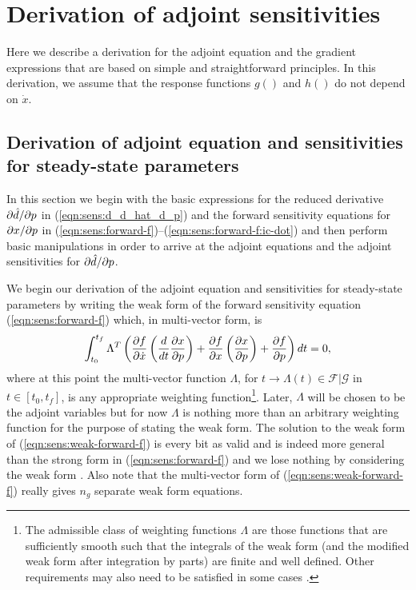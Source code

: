 \documentclass[pdf,ps2pdf,11pt]{SANDreport}
\begin{document}
\section{Derivation of adjoint sensitivities}

Here we describe a derivation for the adjoint equation and the gradient
expressions that are based on simple and straightforward principles.  In this
derivation, we assume that the response functions $g()$ and $h()$ do not
depend on $\dot{x}$.

\subsection{Derivation of adjoint equation and sensitivities for steady-state parameters}
\label{rythmos:app:adj-equ-derivation}

In this section we begin with the basic expressions for the reduced derivative
$\partial \hat{d} / \partial p$ in (\ref{eqn:sens:d_d_hat_d_p}) and the forward sensitivity
equations for $\partial x / \partial p$ in
(\ref{eqn:sens:forward-f})--(\ref{eqn:sens:forward-f:ic-dot}) and then perform
basic manipulations in order to arrive at the adjoint equations and the
adjoint sensitivities for $\partial \hat{d} / \partial p$.

We begin our derivation of the adjoint equation and sensitivities for
steady-state parameters by writing the weak form of the forward sensitivity
equation (\ref{eqn:sens:forward-f}) which, in multi-vector form, is
%
\begin{equation}
\int_{t_0}^{t_f} \Lambda^T \left(
\displaystyle{\frac{\partial f}{\partial \dot{x}}} \left(\frac{d}{dt} \displaystyle{\frac{\partial x}{\partial p}} \right)
+ \displaystyle{\frac{\partial f}{\partial x}} \left(\displaystyle{\frac{\partial x}{\partial p}}\right)
+ \displaystyle{\frac{\partial f}{\partial p}}
\right) dt = 0,
\label{eqn:sens:weak-forward-f}
\end{equation}
%
where at this point the multi-vector function $\Lambda$, for
$t\rightarrow\Lambda(t)\in\mathcal{F}|\mathcal{G}$ in $t\in[t_0,t_f]$, is any
appropriate weighting function\footnote{The admissible class of weighting
functions $\Lambda$ are those functions that are sufficiently smooth such that
the integrals of the weak form (and the modified weak form after integration
by parts) are finite and well defined.  Other requirements may also need to be
satisfied in some cases {}\cite{BeckerCareyOden-FE}.}.  Later, $\Lambda$ will
be chosen to be the adjoint variables but for now $\Lambda$ is nothing more
than an arbitrary weighting function for the purpose of stating the weak form.
The solution to the weak form of (\ref{eqn:sens:weak-forward-f}) is every bit
as valid and is indeed more general than the strong form in
(\ref{eqn:sens:forward-f}) and we lose nothing by considering the weak form
{}\cite{BeckerCareyOden-FE}.  Also note that the multi-vector form of
(\ref{eqn:sens:weak-forward-f}) really gives $n_g$ separate weak form
equations.
\end{document}
